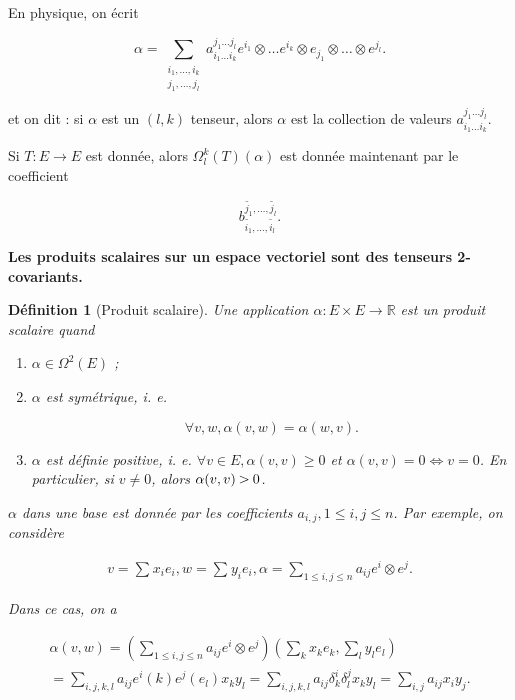 \documentclass[french]{article}
\newtheorem{definition}{Définition}[section]
\newcommand{\biggg}{\rotatebox[origin=c]{90}{$\lor$}}
\newcommand{\bg}{\ \biggg\ }
\begin{document}
En physique, on écrit

\[\alpha = \sum_{\substack{i_1, \dots, i_k \\ j_1, \dots, j_l}}^{} a _{i_1 \dots i_k} ^{j_1 \dots j_l} e ^{i_1} \otimes \dots e ^{i_k} \otimes e _{j_1} \otimes \dots \otimes e ^{j_l}. \]

et on dit : si \(\alpha\) est un \((l, k) \) tenseur, alors \(\alpha\) est la collection de valeurs \(a ^{j_1 \dots j_l} _{i_1 \dots i_k}\).


Si \(T : E \to E\) est donnée, alors \(\Omega ^{k} _{l}(T)(\alpha)\) est donnée maintenant par le coefficient

\[b _{\tilde{i_1}, \dots, \tilde{i_l}} ^{\tilde{j_1}, \dots, \tilde{j_l}}.\]

\textbf{Les produits scalaires sur un espace vectoriel sont des tenseurs 2-covariants.}

\begin{definition}[Produit scalaire]
  Une application \(\alpha : E \times E \to \mathbb{R}\) est un produit scalaire quand

  \begin{enumerate}
    \item \(\alpha \in \Omega ^{2}(E)\) ;
    \item \(\alpha\) est symétrique, i. e.

    \[\forall v, w, \alpha(v,w) = \alpha(w, v).\]

    \item \(\alpha\) est définie positive, i. e. \(\forall v \in E, \alpha(v, v) \geq  0\) et \(\alpha(v,v) = 0 \iff v=0\). En particulier, si \(v \neq 0\), alors \(\alpha(v,v) \bg 0\).
  \end{enumerate}

  \(\alpha\) dans une base est donnée par les coefficients \(a _{i, j}, 1 \leq  i,j \leq n\). Par exemple, on considère

  \begin{gather}
    v = \sum_{}^{} x_i e_i, w = \sum_{}^{} y_i e_i, \alpha = \sum_{1 \leq i,j \leq n}^{} a _{ij} e ^{i} \otimes e ^{j}.
  \end{gather}

  Dans ce cas, on a

  \begin{gather}
    \alpha(v,w) = \left(\sum_{1 \leq i,j \leq n}^{} a _{ij} e ^{i} \otimes e ^{j} \right) \left(\sum _{k} x_k e_k, \sum_{l}^{} y_l e_l\right) \\
    = \sum_{i,j,k,l}^{} a _{ij} e ^{i}(k) e ^{j}(e_l) x_k y_l   = \sum_{i,j,k,l}^{} a _{ij} \delta _{k} ^{i} \delta _{l} ^{j} x_k y_l   = \sum_{i,j}^{} a _{ij} x_i y_j.
  \end{gather}
\end{definition}
\end{document}
